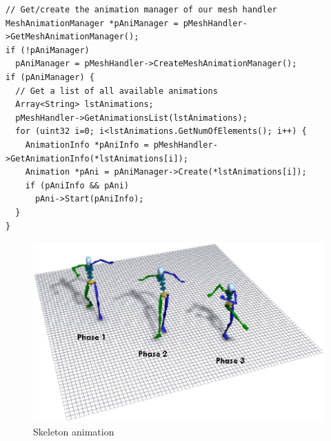 \begin{lstlisting}[caption=Animation playback]
// Get/create the animation manager of our mesh handler
MeshAnimationManager *pAniManager = pMeshHandler->GetMeshAnimationManager();
if (!pAniManager)
  pAniManager = pMeshHandler->CreateMeshAnimationManager();
if (pAniManager) {
  // Get a list of all available animations
  Array<String> lstAnimations;
  pMeshHandler->GetAnimationsList(lstAnimations);
  for (uint32 i=0; i<lstAnimations.GetNumOfElements(); i++) {
    AnimationInfo *pAniInfo = pMeshHandler->GetAnimationInfo(*lstAnimations[i]);
    Animation *pAni = pAniManager->Create(*lstAnimations[i]);
    if (pAniInfo && pAni)
      pAni->Start(pAniInfo);
  }
}
\end{lstlisting}

\begin{figure}
  \centering
  \includegraphics[scale=0.5]{pics/Joints.eps}
  \caption{Skeleton animation}
  \label{fig:Skeleton animation}
\end{figure}
